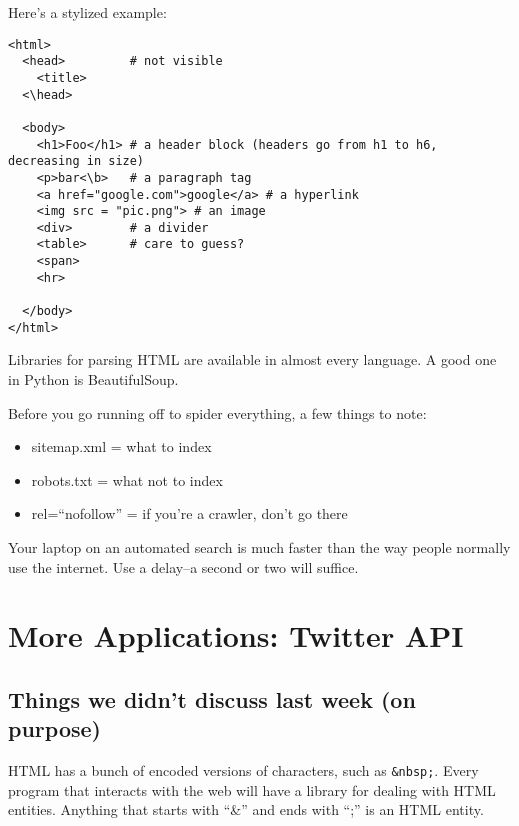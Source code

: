 \documentclass[12pt,letter]{article}
\begin{document}
Here's a stylized example:
\begin{verbatim}
<html>
  <head>         # not visible
    <title>
  <\head>

  <body>
    <h1>Foo</h1> # a header block (headers go from h1 to h6,
decreasing in size)
    <p>bar<\b>   # a paragraph tag
    <a href="google.com">google</a> # a hyperlink
    <img src = "pic.png"> # an image
    <div>        # a divider
    <table>      # care to guess?
    <span>
    <hr>

  </body>
</html>
\end{verbatim}

Libraries for parsing HTML are available in almost every language. A
good one in Python is BeautifulSoup.\footnotemark {}

Before you go running off to spider everything, a few things to note:
\begin{itemize}
\item sitemap.xml = what to index
\item robots.txt = what not to index
\item rel=``nofollow'' = if you're a crawler, don't go there
\end{itemize}

Your laptop on an automated search is much faster than the way people
normally use the internet. Use a delay--a second or two will suffice. 


\section{More Applications: Twitter API}

\subsection{Things we didn't discuss last week (on purpose)}

HTML has a bunch of encoded versions of characters, such as
\texttt{\&nbsp;}. Every program that interacts with the web will have a
library for dealing with HTML entities. Anything that starts with
``\&'' and ends with ``;'' is an HTML entity. 
\end{document}
